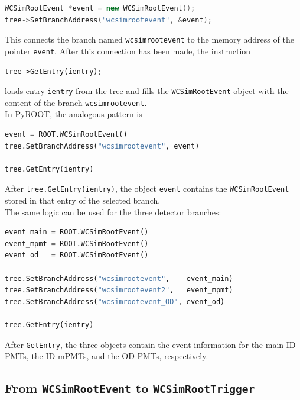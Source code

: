\documentclass{article}
\numberwithin{table}{subsection}
\numberwithin{figure}{subsection}
\numberwithin{equation}{subsection}
\numberwithin{footnote}{subsection}
\begin{document}
\begin{lstlisting}[language=C++]
WCSimRootEvent *event = new WCSimRootEvent();
tree->SetBranchAddress("wcsimrootevent", &event);
\end{lstlisting}
This connects the branch named \texttt{wcsimrootevent} to the memory address of
the pointer \texttt{event}. After this connection has been made, the instruction
\begin{lstlisting}
tree->GetEntry(ientry);
\end{lstlisting}
loads entry \texttt{ientry} from the tree and fills the \texttt{WCSimRootEvent}
object with the content of the branch \texttt{wcsimrootevent}.\\
In PyROOT, the analogous pattern is
\begin{lstlisting}[language=python]
event = ROOT.WCSimRootEvent()
tree.SetBranchAddress("wcsimrootevent", event)

tree.GetEntry(ientry)
\end{lstlisting}
After \texttt{tree.GetEntry(ientry)}, the object \texttt{event} contains the
\texttt{WCSimRootEvent} stored in that entry of the selected branch.\\
The same logic can be used for the three detector branches:

\begin{lstlisting}[language=python]
event_main = ROOT.WCSimRootEvent()
event_mpmt = ROOT.WCSimRootEvent()
event_od   = ROOT.WCSimRootEvent()

tree.SetBranchAddress("wcsimrootevent",    event_main)
tree.SetBranchAddress("wcsimrootevent2",   event_mpmt)
tree.SetBranchAddress("wcsimrootevent_OD", event_od)

tree.GetEntry(ientry)
\end{lstlisting}
After \texttt{GetEntry}, the three objects contain the event information for the
main ID PMTs, the ID mPMTs, and the OD PMTs, respectively.

\subsection{From \texttt{WCSimRootEvent} to \texttt{WCSimRootTrigger}}
\end{document}
